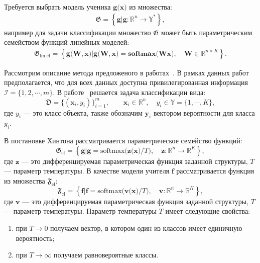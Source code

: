 Требуется выбрать модель ученика $\mathbf{g}\bigr(\mathbf{x}\bigr)$ из множества:
\[
\label{eq:st:G}
\begin{aligned}
\mathfrak{G} = \left\{\mathbf{g}| \mathbf{g}:\mathbb{R}^{n} \to \mathbb{Y}^*\right\},
\end{aligned}
\]
например для задачи классификации множество $\mathfrak{G}$ может быть параметрическим семейством функций линейных моделей:
\[
\label{eq:st:G:lin:cl}
\begin{aligned}
\mathfrak{G}_\text{lin,cl} = \left\{\mathbf{g}\bigr(\mathbf{W}, \mathbf{x}\bigr)| \mathbf{g}\bigr(\mathbf{W}, \mathbf{x}\bigr) = \textbf{softmax}\bigr(\mathbf{W}\mathbf{x}\bigr), \quad \mathbf{W} \in \mathbb{R}^{n\times K}\right\}.
\end{aligned}
\]

Рассмотрим описание метода предложеного в работах~\cite{Hinton2015, Lopez2016}. В рамках данных работ предполагается, что для всех данных доступна привилегированная информация $\mathcal{I} = \{1, 2, \cdots, m\}$. В работе~\cite{Hinton2015} решается задача классификации вида:
\[
    \mathfrak{D} = \{\left(\mathbf{x}_i, y_i\right)\}_{i=1}^{m}, \qquad \mathbf{x}_i \in \mathbb{R}^{n}, \quad y_i \in \mathbb{Y}=\{1, \cdots, K\},
\]
где $y_i$ --- это класс объекта, также обозначим $\mathbf{y}_i$ вектором вероятности для класса $y_i$.

В постановке Хинтона рассматривается параметрическое семейство функций:
\[
\label{eq:G:set:cl}
\mathfrak{G}_{\text{cl}} = \left\{\mathbf{g}| \mathbf{g} = \text{softmax}\bigr(\mathbf{z}\bigr(\mathbf{x}\bigr)/T\bigr), \quad \mathbf{z}: \mathbb{R}^n \to \mathbb{R}^K \right\},
\]
где $\mathbf{z}$ --- это дифференцируемая параметрическая функция заданной структуры, $T$ --- параметр температуры. В качестве модели учителя $\mathbf{f}$ рассматривается функция из множества $\mathfrak{F}_{\text{cl}}$:
\[
\label{eq:F:set:cl}
\mathfrak{F}_{\text{cl}} = \left\{\mathbf{f}| \mathbf{f} = \text{softmax}\bigr(\mathbf{v}\bigr(\mathbf{x}\bigr)/T\bigr), \quad \mathbf{v}: \mathbb{R}^n \to \mathbb{R}^K \right\},
\]
где $\mathbf{v}$ --- это дифференцируемая параметрическая функция заданной структуры, $T$ --- параметр температуры.
Параметр температуры $T$ имеет следующие свойства:
\begin{enumerate}
    \item при $T\to 0$ получаем вектор, в котором один из классов имеет единичную вероятность;
    \item при $T\to \infty$ получаем равновероятные классы.
\end{enumerate}

